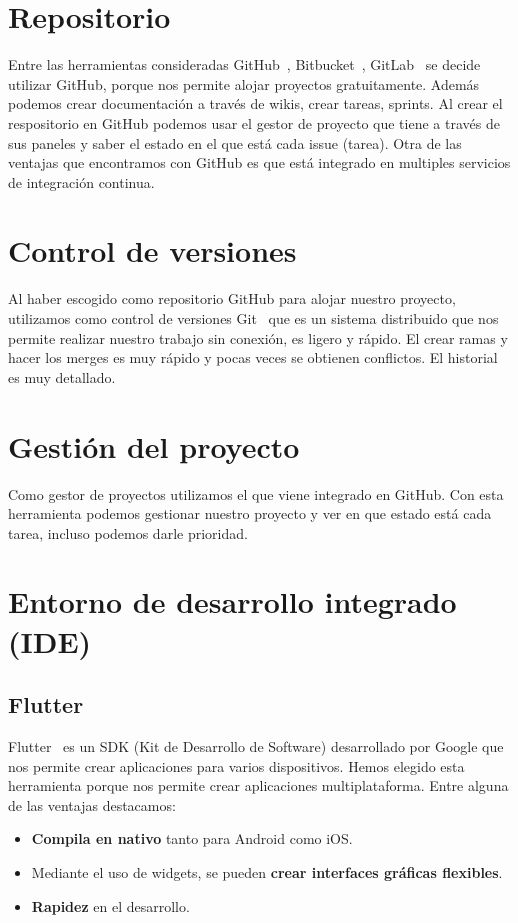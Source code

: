 
\section{Repositorio}
Entre las herramientas consideradas GitHub~\cite{github}, Bitbucket~\cite{bitbucket}, GitLab~\cite{wiki:gitlab} se decide utilizar GitHub, porque nos permite alojar proyectos gratuitamente. Además podemos crear documentación a través de wikis, crear tareas, sprints.
Al crear el respositorio en GitHub podemos usar el gestor de proyecto que tiene a través de sus paneles y saber el estado en el que está cada issue (tarea).
Otra de las ventajas que encontramos con GitHub es que está integrado en multiples servicios de integración continua.
\section{Control de versiones}
Al haber escogido como repositorio GitHub para alojar nuestro proyecto, utilizamos como control de versiones Git~\cite{wiki:git} que es un sistema distribuido que nos permite realizar nuestro trabajo sin conexión, es ligero y rápido.
El crear ramas y hacer los merges es muy rápido y pocas veces se obtienen conflictos.
El historial es muy detallado.
\section{Gestión del proyecto}
Como gestor de proyectos utilizamos el que viene integrado en GitHub. Con esta herramienta podemos gestionar nuestro proyecto y ver en que estado está cada tarea, incluso podemos darle prioridad.
\section{Entorno de desarrollo integrado (IDE)}
\subsection{Flutter}
Flutter~\cite{flutter} es un SDK (Kit de Desarrollo de Software) desarrollado por Google que nos permite crear aplicaciones para varios dispositivos. Hemos elegido esta herramienta porque nos permite crear aplicaciones multiplataforma.
Entre alguna de las ventajas destacamos:
\begin{itemize}
\item \textbf{Compila en nativo} tanto para Android como iOS.
\item Mediante el uso de widgets, se pueden \textbf{crear interfaces gráficas flexibles}.
\item \textbf{Rapidez} en el desarrollo.
\end{itemize}
